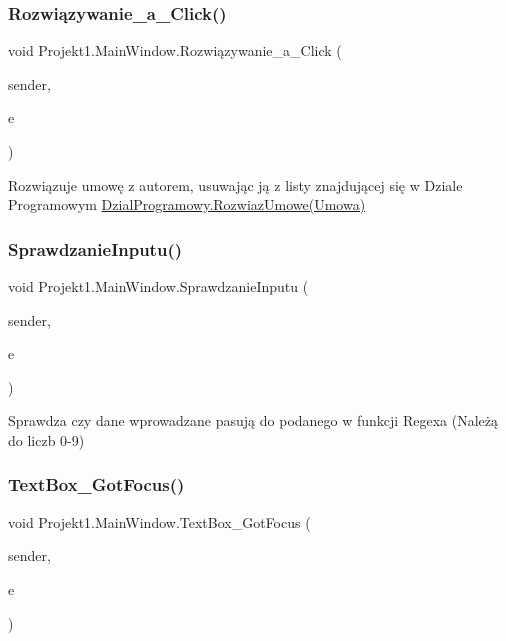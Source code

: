 \subsubsection{\texorpdfstring{Rozwiązywanie\_a\_Click()}{Rozwiązywanie\_a\_Click()}}
{\footnotesize\ttfamily void Projekt1.\+Main\+Window.\+Rozwiązywanie\+\_\+a\+\_\+\+Click (\begin{DoxyParamCaption}\item[{object}]{sender,  }\item[{Routed\+Event\+Args}]{e }\end{DoxyParamCaption})\hspace{0.3cm}{\ttfamily [private]}}



Rozwiązuje umowę z autorem, usuwając ją z listy znajdującej się w Dziale Programowym \mbox{\hyperlink{class_projekt1_1_1_dzial_programowy_a3852b732a1b07ffc107ac6dc90fb5d64}{Dzial\+Programowy.\+Rozwiaz\+Umowe(\+Umowa)}} 

\mbox{\label{class_projekt1_1_1_main_window_a8f44a16b7884a19d25f56bbc8d6879be}} 
\subsubsection{\texorpdfstring{SprawdzanieInputu()}{SprawdzanieInputu()}}
{\footnotesize\ttfamily void Projekt1.\+Main\+Window.\+Sprawdzanie\+Inputu (\begin{DoxyParamCaption}\item[{object}]{sender,  }\item[{Text\+Composition\+Event\+Args}]{e }\end{DoxyParamCaption})\hspace{0.3cm}{\ttfamily [private]}}



Sprawdza czy dane wprowadzane pasują do podanego w funkcji Regexa (Należą do liczb 0-\/9) 

\mbox{\label{class_projekt1_1_1_main_window_a2c13e27e971d368d37047c6b41ba86c4}} 
\subsubsection{\texorpdfstring{TextBox\_GotFocus()}{TextBox\_GotFocus()}}
{\footnotesize\ttfamily void Projekt1.\+Main\+Window.\+Text\+Box\+\_\+\+Got\+Focus (\begin{DoxyParamCaption}\item[{object}]{sender,  }\item[{Routed\+Event\+Args}]{e }\end{DoxyParamCaption})\hspace{0.3cm}{\ttfamily [private]}}



